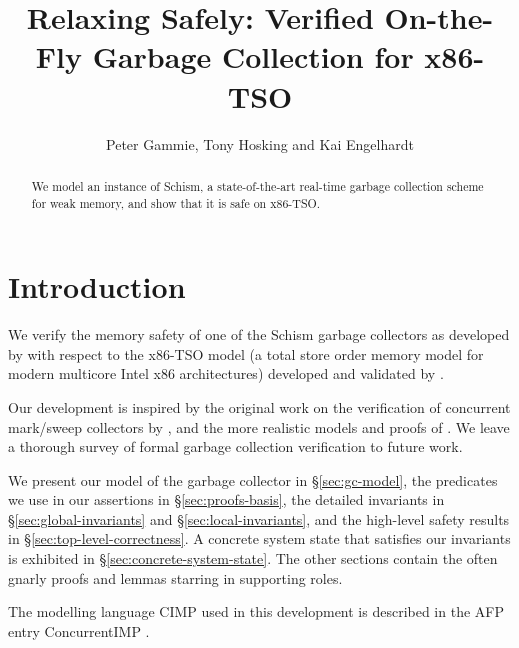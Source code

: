 \documentclass[11pt,a4paper]{article}
\begin{document}
\title{Relaxing Safely: Verified On-the-Fly Garbage Collection for x86-TSO}
\author{Peter Gammie, Tony Hosking and Kai Engelhardt}
\maketitle

\begin{abstract}
  We model an instance of Schism, a state-of-the-art real-time garbage
  collection scheme for weak memory, and show that it is safe on
  x86-TSO.
\end{abstract}

\tableofcontents

\section{Introduction}
\label{sec:introduction}

We verify the memory safety of one of the Schism garbage collectors as
developed by \citet{Pizlo+2010PLDI,Pizlo201xPhd} with respect to the
x86-TSO model (a total store order memory model for modern multicore
Intel x86 architectures) developed and validated by
\citet{DBLP:journals/cacm/SewellSONM10}.

Our development is inspired by the original work on the verification
of concurrent mark/sweep collectors by
\citet{DBLP:journals/cacm/DijkstraLMSS78}, and the more realistic
models and proofs of \citet{DoligezGonthier:1994}. We leave a thorough
survey of formal garbage collection verification to future work.

We present our model of the garbage collector in \S\ref{sec:gc-model},
the predicates we use in our assertions in \S\ref{sec:proofs-basis},
the detailed invariants in \S\ref{sec:global-invariants} and
\S\ref{sec:local-invariants}, and the high-level safety results in
\S\ref{sec:top-level-correctness}. A concrete system state that
satisfies our invariants is exhibited in
\S\ref{sec:concrete-system-state}. The other sections contain the
often gnarly proofs and lemmas starring in supporting roles.

The modelling language CIMP used in this development is described in
the AFP entry ConcurrentIMP \citep{ConcurrentIMP_AFP}.






\end{document}
